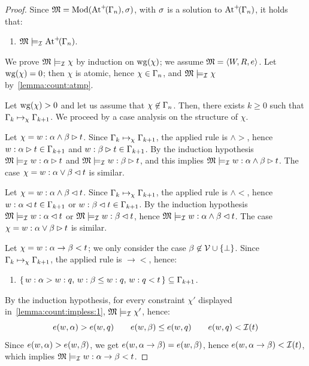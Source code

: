 \begin{proof}
  Since $\mathfrak{M}=\mathrm{Mod}(\mathrm{At}^{+}\!(\Gamma_n),\sigma)$, with $\sigma$ is a solution to $\mathrm{At}^{+}\!(\Gamma_n)$,
  it holds that:
  \begin{enumerate}[label=(\arabic*), ref=(\arabic*),leftmargin=*]
  \item\label{lemma:count:atmp}
    $\mathfrak{M}\models_{\mathcal{I}} \mathrm{At}^{+}\!(\Gamma_n)$.
  \end{enumerate}
  We prove  $\mathfrak{M}\models_{\mathcal{I}} \chi$ by induction on $\mathrm{wg}(\chi)$;
  we assume $\mathfrak{M}=\langle W,R,e \rangle$.
  Let $\mathrm{wg}(\chi)=0$; then $\chi$ is atomic, hence $\chi\in\Gamma_n$,
  and $\mathfrak{M}\models_{\mathcal{I}} \chi$ by~\ref{lemma:count:atmp}.
  
  Let $\mathrm{wg}(\chi)>0$ and let us assume that  $\chi\not\in \Gamma_n$.
  Then, there exists $k \geq  0$ such that
  $\Gamma_k\mapsto_{\chi} \Gamma_{k+1}$. 
  We proceed by a case analysis on the structure of $\chi$.
  
  
  Let $\chi= w:\alpha\land \beta\rhd t$.  Since $\Gamma_k\mapsto_{\chi} \Gamma_{k+1}$,
  the applied rule is $\land\gt$, hence $w:\alpha\rhd t\in \Gamma_{k+1}$ and
  $w:\beta \rhd t\in \Gamma_{k+1}$.  By the induction hypothesis
  $\mathfrak{M}\models_{\mathcal{I}} w:\alpha\rhd t$ and $\mathfrak{M}\models_{\mathcal{I}} w:\beta \rhd t $, and
  this implies $\mathfrak{M}\models_{\mathcal{I}} w:\alpha\land \beta\rhd t$.  The case $\chi=
  w:\alpha\lor \beta\lhd t$ is similar.

  Let $\chi= w:\alpha\land \beta\lhd t$.  Since $\Gamma_k\mapsto_{\chi} \Gamma_{k+1}$,
  the applied rule is $\land\lt$, hence $w:\alpha\lhd t \in \Gamma_{k+1}$ or
  $w:\beta\lhd t \in \Gamma_{k+1}$.  By the induction hypothesis
  $\mathfrak{M}\models_{\mathcal{I}} w:\alpha\lhd t $ or $\mathfrak{M}\models_{\mathcal{I}} w:\beta\lhd t $, hence
  $\mathfrak{M}\models_{\mathcal{I}} w:\alpha\land \beta\lhd t$.  The case $\chi= w:\alpha\lor \beta\rhd
  t$ is similar.
 
 
  Let $\chi= w:\alpha\to \beta < t$; we only consider the case
  $\beta\not\in\mathcal{V}\cup\{\bot\}$.  Since $\Gamma_k\mapsto_{\chi} \Gamma_{k+1}$, the
  applied rule is $\to<$, hence:
 \begin{enumerate}[label=(\Alph*), ref=(\Alph*),leftmargin=*]
 \item\label{lemma:count:impless:1}
   $\{\,w:\alpha > w : q,\, w:\beta \leq w : q,\,w: q < t\,\} \subseteq \Gamma_{k+1}$. 
 \end{enumerate}
 By the induction hypothesis,
 for every constraint $\chi'$  displayed in~\ref{lemma:count:impless:1},
 $\mathfrak{M}\models_{\mathcal{I}} \chi'$, hence:
 \[
 e(w,\alpha) > e(w,q) \qquad e(w,\beta) \leq e(w,q) \qquad e(w,q) < \mathcal{I}(t)
 \]  
 Since $e(w,\alpha) > e(w,\beta)$, we get  $e(w,\alpha\to \beta) = e(w,\beta)$, hence  $e(w,\alpha\to \beta) < \mathcal{I}(t)$,
 which implies $\mathfrak{M}\models_{\mathcal{I}}  w:\alpha\to \beta < t  $.
 

\end{proof}
